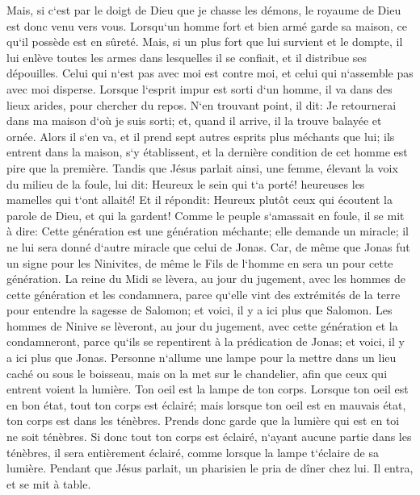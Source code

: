 \verse Mais, si c`est par le doigt de Dieu que je chasse les démons, le royaume de Dieu est donc venu vers vous. 
\verse Lorsqu`un homme fort et bien armé garde sa maison, ce qu`il possède est en sûreté. 
\verse Mais, si un plus fort que lui survient et le dompte, il lui enlève toutes les armes dans lesquelles il se confiait, et il distribue ses dépouilles. 
\verse Celui qui n`est pas avec moi est contre moi, et celui qui n`assemble pas avec moi disperse. 
\verse Lorsque l`esprit impur est sorti d`un homme, il va dans des lieux arides, pour chercher du repos. N`en trouvant point, il dit: Je retournerai dans ma maison d`où je suis sorti; 
\verse et, quand il arrive, il la trouve balayée et ornée. 
\verse Alors il s`en va, et il prend sept autres esprits plus méchants que lui; ils entrent dans la maison, s`y établissent, et la dernière condition de cet homme est pire que la première. 
\verse Tandis que Jésus parlait ainsi, une femme, élevant la voix du milieu de la foule, lui dit: Heureux le sein qui t`a porté! heureuses les mamelles qui t`ont allaité! 
\verse Et il répondit: Heureux plutôt ceux qui écoutent la parole de Dieu, et qui la gardent! 
\verse Comme le peuple s`amassait en foule, il se mit à dire: Cette génération est une génération méchante; elle demande un miracle; il ne lui sera donné d`autre miracle que celui de Jonas. 
\verse Car, de même que Jonas fut un signe pour les Ninivites, de même le Fils de l`homme en sera un pour cette génération. 
\verse La reine du Midi se lèvera, au jour du jugement, avec les hommes de cette génération et les condamnera, parce qu`elle vint des extrémités de la terre pour entendre la sagesse de Salomon; et voici, il y a ici plus que Salomon. 
\verse Les hommes de Ninive se lèveront, au jour du jugement, avec cette génération et la condamneront, parce qu`ils se repentirent à la prédication de Jonas; et voici, il y a ici plus que Jonas. 
\verse Personne n`allume une lampe pour la mettre dans un lieu caché ou sous le boisseau, mais on la met sur le chandelier, afin que ceux qui entrent voient la lumière. 
\verse Ton oeil est la lampe de ton corps. Lorsque ton oeil est en bon état, tout ton corps est éclairé; mais lorsque ton oeil est en mauvais état, ton corps est dans les ténèbres. 
\verse Prends donc garde que la lumière qui est en toi ne soit ténèbres. 
\verse Si donc tout ton corps est éclairé, n`ayant aucune partie dans les ténèbres, il sera entièrement éclairé, comme lorsque la lampe t`éclaire de sa lumière. 
\verse Pendant que Jésus parlait, un pharisien le pria de dîner chez lui. Il entra, et se mit à table. 
